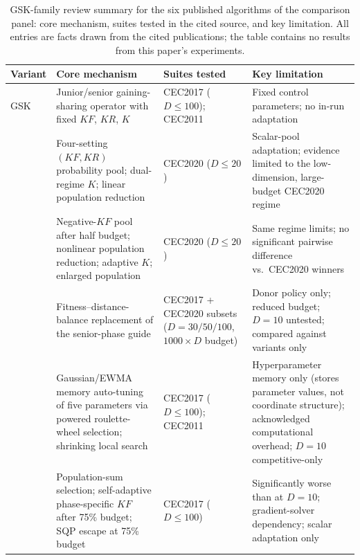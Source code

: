 \begin{table}[H]
\caption{GSK-family review summary for the six published algorithms of
the comparison panel: core mechanism, suites tested in the cited source,
and key limitation. All entries are facts drawn from the cited
publications; the table contains no results from this paper's
experiments.}\label{tab:family-review}
\centering
\tablesize{\footnotesize}
\begin{tabular}{p{1.95cm}p{4.15cm}p{2.6cm}p{4.4cm}}
\toprule
\textbf{Variant} & \textbf{Core mechanism} & \textbf{Suites tested} &
\textbf{Key limitation} \\
\midrule
GSK~\cite{mohamed2020gaining} & Junior/senior gaining-sharing operator
with fixed $KF$, $KR$, $K$ & CEC2017 ($D \leq 100$); CEC2011 & Fixed
control parameters; no in-run adaptation \\ %
\agsk{}~\cite{mohamed2020agsk} & Four-setting $(KF, KR)$ probability
pool; dual-regime $K$; linear population reduction & CEC2020
($D \leq 20$) & Scalar-pool adaptation; evidence limited to the
low-dimension, large-budget CEC2020 regime \\ %
\apgsk{}~\cite{apgsk2021} & Negative-$KF$ pool after half budget;
nonlinear population reduction; adaptive $K$; enlarged population &
CEC2020 ($D \leq 20$) & Same regime limits; no significant pairwise
difference vs.\ CEC2020 winners \\ %
\fdbagsk{}~\cite{fdbagsk2023} & Fitness--distance-balance replacement of
the senior-phase guide & CEC2017 + CEC2020 subsets ($D = 30/50/100$,
$1000 \times D$ budget) & Donor policy only; reduced budget; $D = 10$
untested; compared against \agsk{} variants only \\ %
\atmals{} \cite{alfadli2025atmals} & Gaussian/EWMA memory auto-tuning of
five parameters via powered roulette-wheel selection; shrinking local
search & CEC2017 ($D \leq 100$); CEC2011 & Hyperparameter memory only
(stores parameter values, not coordinate structure); acknowledged
computational overhead; $D = 10$ competitive-only \\ %
\egsk{}~\cite{jawad2024egsk} & Population-sum selection; self-adaptive
phase-specific $KF$ after 75\% budget; SQP escape at 75\% budget &
CEC2017 ($D \leq 100$) & Significantly worse than \agsk{} at $D = 10$;
gradient-solver dependency; scalar adaptation only \\ %
\bottomrule
\end{tabular}
\end{table}

